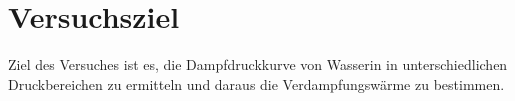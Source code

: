 \section{Versuchsziel}
\label{sec:Versuchsziel}

Ziel des Versuches ist es, die Dampfdruckkurve von Wasserin in unterschiedlichen Druckbereichen zu ermitteln und daraus die Verdampfungswärme zu bestimmen.